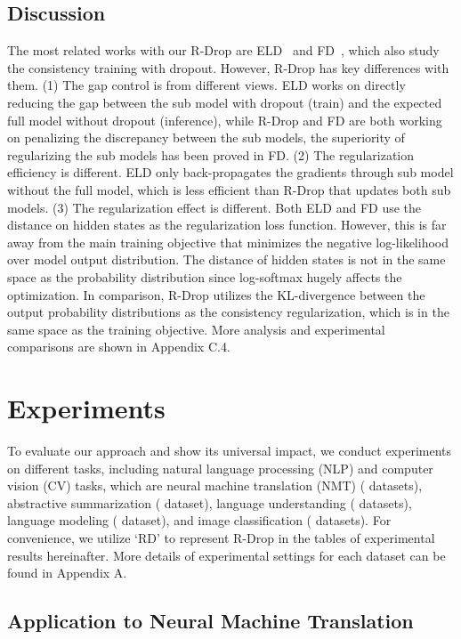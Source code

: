 \documentclass{article}
\begin{document}
\subsection{Discussion}
\label{sec:discuss}
The most related works with our R-Drop are ELD~\citep{ma2016dropout} and FD~\citep{zolna2017fraternal}, which also study the consistency training with dropout.
However, R-Drop has key differences with them.
(1) The gap control is from different views. ELD works on directly reducing the gap between the sub model with dropout (train) and the expected full model without dropout (inference), while R-Drop and FD are both working on penalizing the discrepancy between the sub models, the superiority of regularizing the sub models has been proved in FD.
(2) The regularization efficiency is different. ELD only back-propagates the gradients through sub model without the full model, which is less efficient than R-Drop that updates both sub models.
(3) The regularization effect is different. Both ELD and FD use the  distance on hidden states as the regularization loss function. However, this is far away from the main training objective that minimizes the negative log-likelihood over model output distribution.
The distance of hidden states is not in the same space as the probability distribution since log-softmax hugely affects the optimization.
In comparison, R-Drop utilizes the KL-divergence between the output probability distributions as the consistency regularization, which is in the same space as the training objective.
More analysis and experimental comparisons are shown in Appendix C.4.


\section{Experiments}
\label{sec:experiments}
To evaluate our approach and show its universal impact, we conduct experiments on  different tasks, including  natural language processing (NLP) and  computer vision (CV) tasks, which are neural machine translation (NMT) ( datasets), abstractive summarization ( dataset), language understanding ( datasets), language modeling ( dataset), and image classification ( datasets). 
For convenience, we utilize `RD' to represent R-Drop in the tables of experimental results hereinafter. More details of experimental settings for each dataset can be found in Appendix A.


\subsection{Application to Neural Machine Translation}
\label{sec:nmt}
\end{document}
